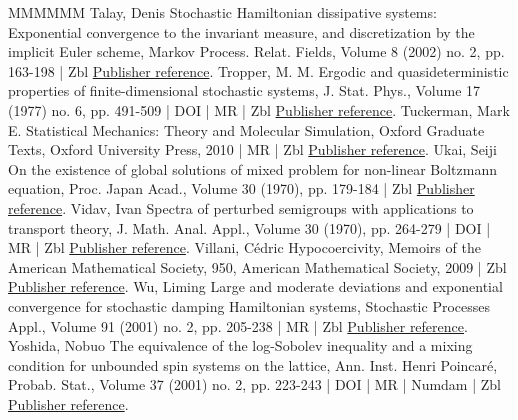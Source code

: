 \documentclass[10pt,a4paper]{article}
\numberwithin{equation}{section}
\begin{document}
\begin{thebibliography}{MMMMMM}
 Talay, Denis Stochastic Hamiltonian dissipative systems: Exponential convergence to the invariant measure, and discretization by the implicit Euler scheme, Markov Process. Relat. Fields, Volume 8 (2002) no. 2, pp. 163-198 | Zbl \href{https://ahl.centre-mersenne.org/item/AHL_2022__5__523_0/#Talay02}{Publisher reference}.
 Tropper, M. M. Ergodic and quasideterministic properties of finite-dimensional stochastic systems, J. Stat. Phys., Volume 17 (1977) no. 6, pp. 491-509 | DOI | MR | Zbl \href{https://ahl.centre-mersenne.org/item/AHL_2022__5__523_0/#Tropper77}{Publisher reference}.
 Tuckerman, Mark E. Statistical Mechanics: Theory and Molecular Simulation, Oxford Graduate Texts, Oxford University Press, 2010 | MR | Zbl \href{https://ahl.centre-mersenne.org/item/AHL_2022__5__523_0/#Tuckerman}{Publisher reference}.
 Ukai, Seiji On the existence of global solutions of mixed problem for non-linear Boltzmann equation, Proc. Japan Acad., Volume 30 (1970), pp. 179-184 | Zbl \href{https://ahl.centre-mersenne.org/item/AHL_2022__5__523_0/#Ukai74}{Publisher reference}.
 Vidav, Ivan Spectra of perturbed semigroups with applications to transport theory, J. Math. Anal. Appl., Volume 30 (1970), pp. 264-279 | DOI | MR | Zbl \href{https://ahl.centre-mersenne.org/item/AHL_2022__5__523_0/#Vidav70}{Publisher reference}.
 Villani, Cédric Hypocoercivity, Memoirs of the American Mathematical Society, 950, American Mathematical Society, 2009 | Zbl \href{https://ahl.centre-mersenne.org/item/AHL_2022__5__523_0/#Villani09}{Publisher reference}.
 Wu, Liming Large and moderate deviations and exponential convergence for stochastic damping Hamiltonian systems, Stochastic Processes Appl., Volume 91 (2001) no. 2, pp. 205-238 | MR | Zbl \href{https://ahl.centre-mersenne.org/item/AHL_2022__5__523_0/#Wu01}{Publisher reference}.
 Yoshida, Nobuo The equivalence of the log-Sobolev inequality and a mixing condition for unbounded spin systems on the lattice, Ann. Inst. Henri Poincaré, Probab. Stat., Volume 37 (2001) no. 2, pp. 223-243 | DOI | MR | Numdam | Zbl \href{https://ahl.centre-mersenne.org/item/AHL_2022__5__523_0/#yos2001}{Publisher reference}.
\end{thebibliography}
\end{document}
